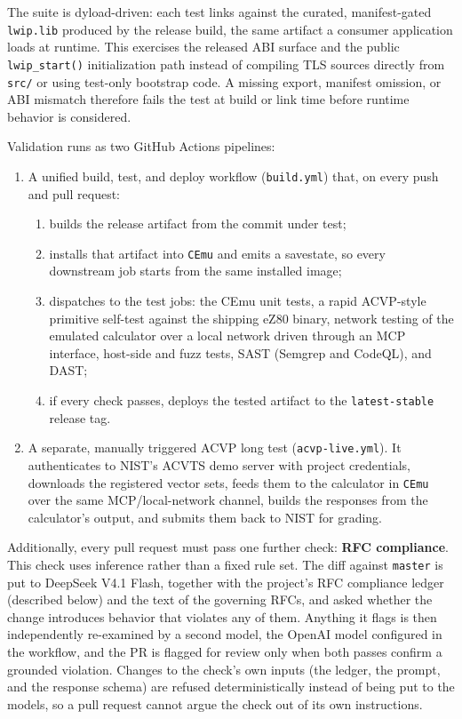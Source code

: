 \documentclass[titlepage]{report}
\begin{document}
		The suite is dyload-driven: each test links against the curated, manifest-gated \texttt{lwip.lib} produced by the release build, the same artifact a consumer application loads at runtime. This exercises the released ABI surface and the public \texttt{lwip\_start()} initialization path instead of compiling TLS sources directly from \texttt{src/} or using test-only bootstrap code. A missing export, manifest omission, or ABI mismatch therefore fails the test at build or link time before runtime behavior is considered.

		Validation runs as two GitHub Actions pipelines:
		\begin{enumerate}
			\item A unified build, test, and deploy workflow (\texttt{build.yml}) that, on every push and pull request:
			\begin{enumerate}
				\item builds the release artifact from the commit under test;
				\item installs that artifact into \texttt{CEmu} and emits a savestate, so every downstream job starts from the same installed image;
				\item dispatches to the test jobs: the CEmu unit tests, a rapid ACVP-style primitive self-test against the shipping eZ80 binary, network testing of the emulated calculator over a local network driven through an MCP interface, host-side and fuzz tests, SAST (Semgrep and CodeQL), and DAST;
				\item if every check passes, deploys the tested artifact to the \texttt{latest-stable} release tag.
			\end{enumerate}
			\item A separate, manually triggered ACVP long test (\texttt{acvp-live.yml}). It authenticates to NIST's ACVTS demo server with project credentials, downloads the registered vector sets, feeds them to the calculator in \texttt{CEmu} over the same MCP/local-network channel, builds the responses from the calculator's output, and submits them back to NIST for grading.
		\end{enumerate}

		Additionally, every pull request must pass one further check: \textbf{RFC compliance}. This check uses inference rather than a fixed rule set. The diff against \texttt{master} is put to DeepSeek V4.1 Flash, together with the project's RFC compliance ledger (described below) and the text of the governing RFCs, and asked whether the change introduces behavior that violates any of them. Anything it flags is then independently re-examined by a second model, the OpenAI model configured in the workflow, and the PR is flagged for review only when both passes confirm a grounded violation. Changes to the check's own inputs (the ledger, the prompt, and the response schema) are refused deterministically instead of being put to the models, so a pull request cannot argue the check out of its own instructions.
\end{document}
